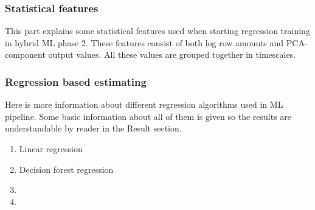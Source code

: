 \subsubsection*{Statistical features}
\begin{itcomment}
    This part explains some statistical features used when starting regression training
    in hybrid ML phase 2.
    These features consist of both log row amounts
    and PCA-component output values.
    All these values are grouped together in timescales.
\end{itcomment}


\subsubsection*{Regression based estimating}
\begin{itcomment}
    Here is more information about different regression algorithms
    used in ML pipeline.
    Some basic information about all of them is given so the results are understandable
    by reader in the Result section.
\end{itcomment}

\begin{enumerate}
    \item Linear regression
    \item Decision forest regression
    \item \etc
    \item \etc
\end{enumerate}


\clearpage